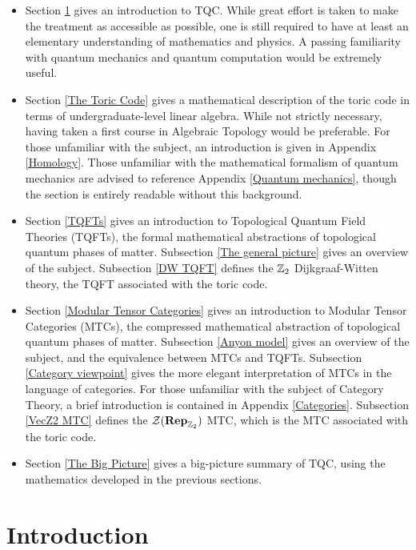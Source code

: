 \documentclass{article}
\theoremstyle{definition}
\numberwithin{figure}{section}
\begin{document}
\begin{itemize}
\item Section \ref{Introduction} gives an introduction to TQC. While great effort is taken to make the treatment as accessible as possible, one is still required to have at least an elementary understanding of mathematics and physics. A passing familiarity with quantum mechanics and quantum computation would be extremely useful.

\item Section \ref{The Toric Code} gives a mathematical description of the toric code in terms of undergraduate-level linear algebra. While not strictly necessary, having taken a first course in Algebraic Topology would be preferable. For those unfamiliar with the subject, an introduction is given in Appendix \ref{Homology}. Those unfamiliar with the mathematical formalism of quantum mechanics are advised to reference Appendix \ref{Quantum mechanics}, though the section is entirely readable without this background.

\item Section \ref{TQFTs} gives an introduction to Topological Quantum Field Theories (TQFTs), the formal mathematical abstractions of topological quantum phases of matter. Subsection \ref{The general picture} gives an overview of the subject. Subsection \ref{DW TQFT} defines the $\mathbb{Z}_2$ Dijkgraaf-Witten theory, the TQFT associated with the toric code.

\item Section \ref{Modular Tensor Categories} gives an introduction to Modular Tensor Categories (MTCs), the compressed mathematical abstraction of topological quantum phases of matter. Subsection \ref{Anyon model} gives an overview of the subject, and the equivalence between MTCs and TQFTs. Subsection \ref{Category viewpoint} gives the more elegant interpretation of MTCs in the language of categories. For those unfamiliar with the subject of Category Theory, a brief introduction is contained in Appendix \ref{Categories}. Subsection \ref{VecZ2 MTC} defines the $\mathcal{Z}(\bold{Rep}_{\mathbb{Z}_2})$ MTC, which is the MTC associated with the toric code.

\item Section \ref{The Big Picture} gives a big-picture summary of TQC, using the mathematics developed in the previous sections.

\end{itemize}



\section{Introduction}
\label{Introduction}
\end{document}
